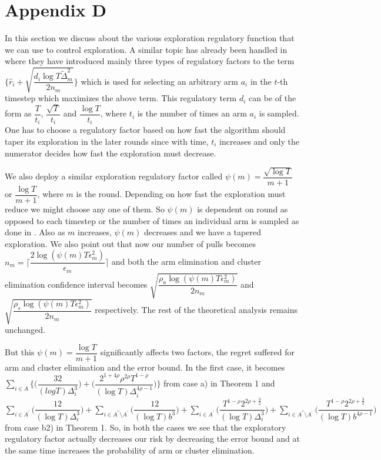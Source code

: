 \section{Appendix D}

In this section we discuss about the various exploration regulatory function that we can use to control exploration. A similar topic has already been handled in \cite{liu2016modification} where they have introduced mainly three types of regulatory factors to the term $\bigg\lbrace\hat{r}_{i}+\sqrt{\dfrac{d_{i}\log T\tilde{\Delta}_{m}^{2}}{2n_{m}}}\bigg\rbrace$ which is used for selecting an arbitrary arm $a_{i}$ in the $t$-th timestep which maximizes the above term. This regulatory term $d_{i}$ can be of the form as $\dfrac{T}{t_{i}}$, $\dfrac{\sqrt{T}}{t_{i}}$ and $\dfrac{\log T}{t_{i}}$, where $t_{i}$ is the number of times an arm $a_{i}$ is sampled. One has to choose a regulatory factor based on how fast the algorithm should taper its exploration in the later rounds since with time, $t_{i}$ increases and only the numerator decides how fast the exploration must decrease.

	We also deploy a similar exploration regulatory factor called $\psi(m)=\dfrac{\sqrt{\log T}}{m+1}$ or $\dfrac{\log T}{m+1}$, where $m$ is the round. Depending on how fast the exploration must reduce we might choose any one of them. So $\psi(m)$ is dependent on round as opposed to each timestep or the number of times an individual arm is sampled as done in \cite{liu2016modification}. Also as $m$ increases, $\psi(m)$ decreases and we have a tapered exploration. We also point out that now our number of pulls becomes $n_{m}=\bigg\lceil\dfrac{2\log{(\psi(m)T\epsilon_{m}^{2})}}{\epsilon_{m}}\bigg\rceil$ and both the arm elimination and cluster elimination confidence interval becomes $\sqrt{\dfrac{\rho_{a}\log{(\psi(m)T\epsilon_{m}^{2})}}{2 n_{m}}}$ and $\sqrt{\dfrac{\rho_{s} \log{(\psi(m)T\epsilon_{m}^{2})}}{2 n_{m}}}$  respectively. The rest of the theoretical analysis remains unchanged. 
	
	But this $\psi(m)=\dfrac{\log T}{m+1}$ significantly affects two factors, the regret suffered for arm and cluster elimination and the error bound. In the first case, it becomes $ \sum_{i\in A}\bigg\lbrace\bigg(\dfrac{32}{(log T)\Delta_{i}^{3}}\bigg) + \bigg(\dfrac{2^{1+4\rho}\rho^{2\rho}T^{1-\rho}}{(\log T)\Delta_{i}^{4\rho-1}}\bigg)\bigg\rbrace$ from case a) in Theorem 1 and $\sum_{i\in A^{'}}\bigg(\dfrac{12}{(\log T)\Delta_{i}^{3}} \bigg)+\sum_{i\in A^{''}\setminus A^{'}}\bigg(\dfrac{12}{(\log T) b^{3}} \bigg) + \sum_{i\in A^{'}}\bigg(\dfrac{T^{1-\rho}2^{2\rho+\frac{3}{2}}}{(\log T) \Delta_{i}^{3}} \bigg)+\sum_{i\in A^{''}\setminus A^{'}}\bigg(\dfrac{T^{1-\rho}2^{2\rho+\frac{3}{2}}}{(\log T) b^{4\rho -1}} \bigg)$ from case b2) in Theorem 1. So, in both the cases we see that the exploratory regulatory factor actually decreases our risk by decreasing the error bound and at the same time increases the probability of arm or cluster elimination. 
	
